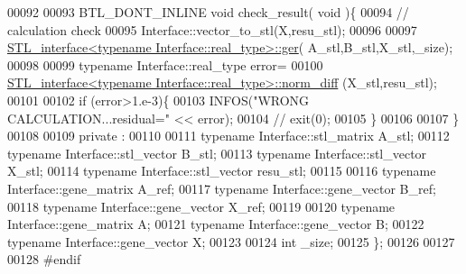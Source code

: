 \begin{DoxyCode}
00092 
00093   BTL\_DONT\_INLINE \textcolor{keywordtype}{void} check\_result( \textcolor{keywordtype}{void} )\{
00094     \textcolor{comment}{// calculation check}
00095     Interface::vector\_to\_stl(X,resu\_stl);
00096 
00097     \hyperlink{class_s_t_l__interface}{STL\_interface<typename Interface::real\_type>::ger}(
      A\_stl,B\_stl,X\_stl,\_size);
00098 
00099     \textcolor{keyword}{typename} Interface::real\_type error=
00100       \hyperlink{class_s_t_l__interface}{STL\_interface<typename Interface::real\_type>::norm\_diff}
      (X\_stl,resu\_stl);
00101 
00102     \textcolor{keywordflow}{if} (error>1.e-3)\{
00103       INFOS(\textcolor{stringliteral}{"WRONG CALCULATION...residual="} << error);
00104 \textcolor{comment}{//       exit(0);}
00105     \}
00106 
00107   \}
00108 
00109 private :
00110 
00111   \textcolor{keyword}{typename} Interface::stl\_matrix A\_stl;
00112   \textcolor{keyword}{typename} Interface::stl\_vector B\_stl;
00113   \textcolor{keyword}{typename} Interface::stl\_vector X\_stl;
00114   \textcolor{keyword}{typename} Interface::stl\_vector resu\_stl;
00115 
00116   \textcolor{keyword}{typename} Interface::gene\_matrix A\_ref;
00117   \textcolor{keyword}{typename} Interface::gene\_vector B\_ref;
00118   \textcolor{keyword}{typename} Interface::gene\_vector X\_ref;
00119 
00120   \textcolor{keyword}{typename} Interface::gene\_matrix A;
00121   \textcolor{keyword}{typename} Interface::gene\_vector B;
00122   \textcolor{keyword}{typename} Interface::gene\_vector X;
00123 
00124   \textcolor{keywordtype}{int} \_size;
00125 \};
00126 
00127 
00128 \textcolor{preprocessor}{#endif}
\end{DoxyCode}
